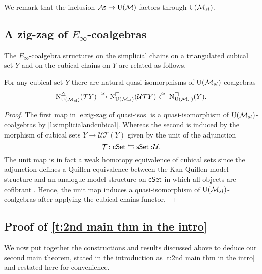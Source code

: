 We remark that the inclusion ${\mathcal{A}\mathsf{s}} \to {\operatorname{U}(\mathcal{M})}$ factors through ${\operatorname{U}(\mathcal{M}_{sl})}$.

\subsection{A zig-zag of $E_\infty$-coalgebras}
The $E_{\infty}$-coalgebra structures on the simplicial chains on a triangulated cubical set $Y$ and on the cubical chains on $Y$ are related as follows.

\begin{proposition} \label{p:zigzag} 
	For any cubical set $Y$ there are natural quasi-isomorphisms of ${\operatorname{U}(\mathcal{M}_{sl})}$-coalgebras
	\begin{equation} \label{e:zig-zag of quasi-isos}
	\operatorname{N^{\triangle}_{{\operatorname{U}(\mathcal{M}_{sl})}}}(\mathcal{T}Y) \xrightarrow{\simeq}
	\operatorname{N^{\square}_{{\operatorname{U}(\mathcal{M}_{sl})}}}(\mathcal{U}\mathcal{T}Y) \xleftarrow{\simeq}
	\operatorname{N^{\square}_{{\operatorname{U}(\mathcal{M}_{sl})}}}(Y).
	\end{equation}	
\end{proposition}

\begin{proof}
	The first map in \eqref{e:zig-zag of quasi-isos} is a quasi-isomorphism of ${\operatorname{U}(\mathcal{M}_{sl})}$-coalgebras by \cref{l:simplicialandcubical}.
	Whereas the second is induced by the morphism of cubical sets $Y \to \mathcal{U} \mathcal{T} (Y)$ given by the unit of the adjunction
	\begin{equation*}
	\mathcal{T} \colon \mathsf{cSet} \leftrightarrows \mathsf{sSet} :\! \mathcal{U}.
	\end{equation*}
	The unit map is in fact a weak homotopy equivalence of cubical sets since the adjunction defines a Quillen equivalence between the Kan-Quillen model structure and an analogue model structure on $\mathsf{cSet}$ in which all objects are cofibrant \cite{cisinski2006presheaves}.
	Hence, the unit map induces a quasi-isomorphism of ${\operatorname{U}(\mathcal{M}_{sl})}$-coalgebras after applying the cubical chains functor.
\end{proof}

\subsection{Proof of \cref{t:2nd main thm in the intro}}

We now put together the constructions and results discussed above to deduce our second main theorem, stated in the introduction as \cref{t:2nd main thm in the intro} and restated here for convenience.

